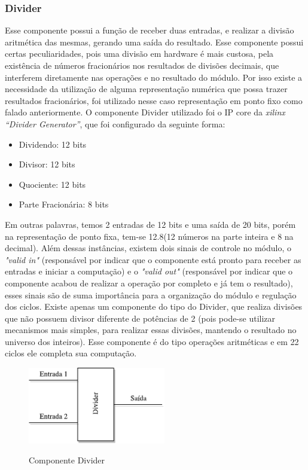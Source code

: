 \subsubsection{Divider}
Esse componente possui a função de receber duas entradas, e realizar a divisão aritmética das mesmas, gerando uma saída do resultado. Esse componente possui certas peculiaridades, pois uma divisão em hardware é mais custosa, pela existência de números fracionários nos resultados de divisões decimais, que interferem diretamente nas operações e no resultado do módulo. Por isso existe a necessidade da utilização de alguma representação numérica que possa trazer resultados fracionários, foi utilizado nesse caso representação em ponto fixo como falado anteriormente. O componente Divider utilizado foi o IP core da \textit{xilinx “Divider Generator”}, que foi configurado da seguinte forma: 
\begin{itemize}
	\item 	Dividendo: 12 bits
	\item 	Divisor: 12 bits
	\item 	Quociente: 12 bits
	\item 	Parte Fracionária: 8 bits
\end{itemize}
Em outras palavras, temos 2 entradas de 12 bits e uma saída de 20 bits, porém na representação de ponto fixa, tem-se 12.8(12 números na parte inteira e 8 na decimal). Além dessas instâncias, existem dois sinais de controle no módulo, o \textit{"valid in"} (responsável por indicar que o componente está pronto para receber as entradas e iniciar a computação) e o \textit{"valid out"} (responsável por indicar que o componente acabou de realizar a operação por completo e já tem o resultado), esses sinais são de suma importância para a organização do módulo e regulação dos ciclos. Existe apenas um componente do tipo do Divider, que realiza divisões que não possuem divisor diferente de potências de 2 (pois pode-se utilizar mecanismos mais simples, para realizar essas divisões, mantendo o resultado no universo dos inteiros).  Esse componente é do tipo operações aritméticas e em 22 ciclos ele completa sua computação.

\begin{figure}[H]
	\centering
	\includegraphics[width=6cm]{figures/Divider.pdf}\\
	\caption{Componente Divider}
	\label{divider}
\end{figure}

